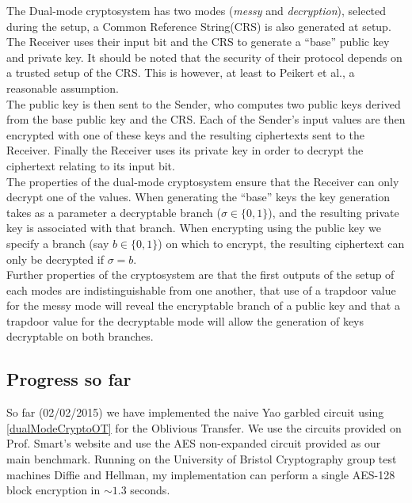 \documentclass[a4paper,10pt]{article}
\begin{document}
			The Dual-mode cryptosystem has two modes (\emph{messy} and \emph{decryption}), selected during the setup, a Common Reference String(CRS) is also generated at setup. The Receiver uses their input bit and the CRS to generate  a ``base'' public key and private key. It should be noted that the security of their protocol depends on a trusted setup of the CRS. This is however, at least to Peikert et al., a reasonable assumption.\\

			The public key is then sent to the Sender, who computes two public keys derived from the base public key and the CRS. Each of the Sender's input values are then encrypted with one of these keys and the resulting ciphertexts sent to the Receiver. Finally the Receiver uses its private key in order to decrypt the ciphertext relating to its input bit.\\

			The properties of the dual-mode cryptosystem ensure that the Receiver can only decrypt one of the values. When generating the ``base'' keys the key generation takes as a parameter a decryptable branch ($\sigma \in \{0, 1\}$), and the resulting private key is associated with that branch. When encrypting using the public key we specify a branch (say $b \in \{0, 1\}$) on which to encrypt, the resulting ciphertext can only be decrypted if $\sigma = b$.\\

 			Further properties of the cryptosystem are that the first outputs of the setup of each modes are indistinguishable from one another, that use of a trapdoor value for the messy mode will reveal the encryptable branch of a public key and that a trapdoor value for the decryptable mode will allow the generation of keys decryptable on both branches.


		\subsection{Progress so far}
			So far (02/02/2015) we have implemented the naive Yao garbled circuit using \ref{dualModeCryptoOT} for the Oblivious Transfer. We use the circuits provided on Prof. Smart's website \cite{NigelCircuits} and use the AES non-expanded circuit provided as our main benchmark. Running on the University of Bristol Cryptography group test machines Diffie and Hellman, my implementation can perform a single AES-128 block encryption in $\sim 1.3$ seconds.
\end{document}
